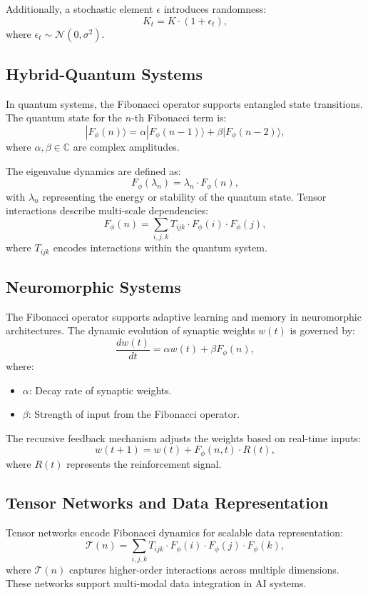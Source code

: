 \documentclass{article}
\theoremstyle{plain}
\begin{document}
\begin{itemize}
\begin{itemize}
Additionally, a stochastic element \( \epsilon \) introduces randomness:
\[
K_t = K \cdot (1 + \epsilon_t),
\]
where \( \epsilon_t \sim \mathcal{N}(0, \sigma^2) \).

\subsection{Hybrid-Quantum Systems}
In quantum systems, the Fibonacci operator supports entangled state transitions. The quantum state for the \( n \)-th Fibonacci term is:
\[
|F_\phi(n)\rangle = \alpha |F_\phi(n-1)\rangle + \beta |F_\phi(n-2)\rangle,
\]
where \( \alpha, \beta \in \mathbb{C} \) are complex amplitudes.

The eigenvalue dynamics are defined as:
\[
F_\phi(\lambda_n) = \lambda_n \cdot F_\phi(n),
\]
with \( \lambda_n \) representing the energy or stability of the quantum state. Tensor interactions describe multi-scale dependencies:
\[
F_\phi(n) = \sum_{i,j,k} T_{ijk} \cdot F_\phi(i) \cdot F_\phi(j),
\]
where \( T_{ijk} \) encodes interactions within the quantum system.

\subsection{Neuromorphic Systems}
The Fibonacci operator supports adaptive learning and memory in neuromorphic architectures. The dynamic evolution of synaptic weights \( w(t) \) is governed by:
\[
\frac{dw(t)}{dt} = \alpha w(t) + \beta F_\phi(n),
\]
where:
\begin{itemize}
    \item \( \alpha \): Decay rate of synaptic weights.
    \item \( \beta \): Strength of input from the Fibonacci operator.
\end{itemize}

The recursive feedback mechanism adjusts the weights based on real-time inputs:
\[
w(t+1) = w(t) + F_\phi(n, t) \cdot R(t),
\]
where \( R(t) \) represents the reinforcement signal.

\subsection{Tensor Networks and Data Representation}
Tensor networks encode Fibonacci dynamics for scalable data representation:
\[
\mathcal{T}(n) = \sum_{i,j,k} T_{ijk} \cdot F_\phi(i) \cdot F_\phi(j) \cdot F_\phi(k),
\]
where \( \mathcal{T}(n) \) captures higher-order interactions across multiple dimensions. These networks support multi-modal data integration in AI systems.


\end{itemize}
\end{itemize}
\end{document}
